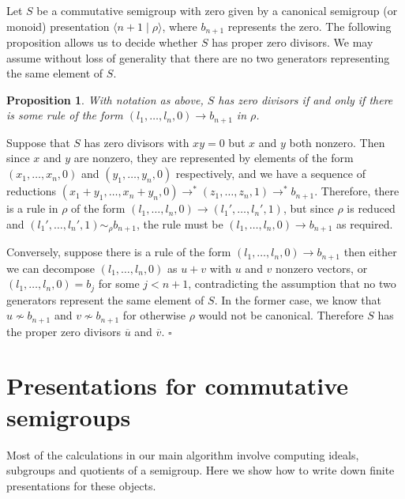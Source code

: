 \documentclass[12pt]{article}
\newtheorem{proposition}{\qquad\bf Proposition}
\newenvironment{proof}{{\it Proof.\/}}{$\square$\\}
\begin{document}
Let $S$ be a commutative semigroup with zero
given by a canonical semigroup (or monoid)
presentation $\langle n + 1 \mid \rho \rangle$, where $b_{n+1}$
represents the zero. The following proposition allows us to decide
whether $S$ has proper zero divisors. We may assume without loss
of generality that there are no two generators representing the same
element of $S$.

\begin{proposition}
With notation as above, $S$ has zero divisors if and only if
there is some rule of the form $(l_1, \ldots, l_n,0) \rightarrow
b_{n+1}$
in $\rho$.
\end{proposition}

\begin{proof}
Suppose that $S$ has zero divisors with $xy = 0$ but
$x$ and $y$ both nonzero. Then since $x$ and $y$ are nonzero,
they are represented by elements of the form 
$(x_1, \ldots, x_n,0)$ and $(y_1, \ldots, y_n,0)$
respectively, and we have a sequence of reductions
$(x_1 + y_1, \ldots, x_n + y_n,0) \rightarrow^* (z_1, \ldots, z_n,1)
\rightarrow^* b_{n+1}$.
Therefore, there is a rule in $\rho$ of the form
$(l_1, \ldots, l_n,0) \rightarrow (l_1', \ldots, l_n',1)$, but since
$\rho$ is reduced and $(l_1', \ldots, l_n',1) \sim_\rho b_{n+1}$,
the rule must be $(l_1, \ldots, l_n,0) \rightarrow b_{n+1}$ as required.

Conversely, suppose there is a rule of the form
$(l_1, \ldots, l_n,0) \rightarrow b_{n+1}$ then either
we can decompose $(l_1, \ldots, l_n,0)$ as $u + v$ with
$u$ and $v$ nonzero vectors, or
$(l_1, \ldots, l_n,0) =  b_j$ for some $j < n+1$, contradicting
the assumption that no two generators represent the same element of
$S$. In the former case, we know that $u \not\sim b_{n+1}$ and 
$v \not\sim b_{n+1}$ for otherwise $\rho$ would not be canonical. 
Therefore $S$ has the proper
zero divisors $\overline{u}$ and $\overline{v}$.  
\end{proof}

\section{Presentations for commutative semigroups}

Most of the calculations in our main algorithm 
involve computing
ideals, subgroups and quotients of a semigroup. 
Here we show how to write down finite presentations 
for these objects.
\end{document}
